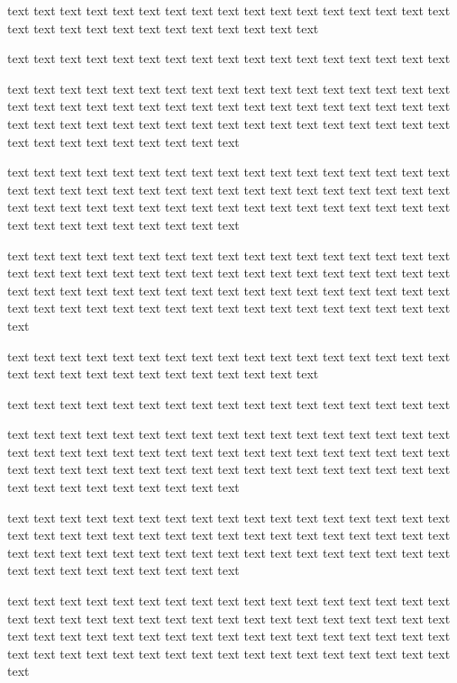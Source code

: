 \documentclass{article}
\begin{document}
    text text text text text text text text text text text text text text text text text text text text text text text text text text text text text

    text text text text text text text text text text text text text text text text text

text text text text text text text text text text text text text text text text text text text text text text text text text text text text text text text text text text text text text text text text text text text text text text text text text text text text text text text text text text text text

    text text text text text text text text text text text text text text text text text text text text text text text text text text text text text text text text text text text text text text text text text text text text text text text text text text text text text text text text text text text text

    text text text text text text text text text text text text text text text text text text text text text text text text text text text text text text text text text text text text text text text text text text text text text text text text text text text text text text text text text text text text text text text text text text text text text

    text text text text text text text text text text text text text text text text text text text text text text text text text text text text text

    text text text text text text text text text text text text text text text text text

text text text text text text text text text text text text text text text text text text text text text text text text text text text text text text text text text text text text text text text text text text text text text text text text text text text text text text text text text text text text

    text text text text text text text text text text text text text text text text text text text text text text text text text text text text text text text text text text text text text text text text text text text text text text text text text text text text text text text text text text text text

    text text text text text text text text text text text text text text text text text text text text text text text text text text text text text text text text text text text text text text text text text text text text text text text text text text text text text text text text text text text text text text text text text text text text text
\end{document}
